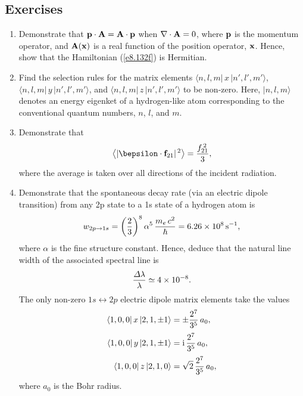 \subsection*{Exercises}
\begin{enumerate}[label=\thechapter.\arabic*,leftmargin=*,widest=9.20]
\item Demonstrate that ${\bf p}\cdot{\bf A}={\bf A}\cdot{\bf p}$ when $\nabla\cdot{\bf A} = 0$, where
${\bf p}$ is the momentum operator, and ${\bf A}({\bf x})$  is a real function of the position operator, ${\bf x}$. 
Hence, show that the Hamiltonian (\ref{e8.132f}) is Hermitian.

\item Find the selection rules for the matrix elements $\langle n,l,m|\,x\,|n',l',m'\rangle$, $\langle n,l,m|\,y\,|n',l',m'\rangle$,
and $\langle n,l,m|\,z\,|n',l',m'\rangle$ to be non-zero. Here, $|n,l,m\rangle$ denotes an energy eigenket of a hydrogen-like
atom corresponding to the conventional quantum numbers, $n$, $l$, and $m$. 

\item Demonstrate that 
$$
\left\langle |\bepsilon\cdot{\bf f}_{21}|^{\,2}\right\rangle = \frac{f_{21}^{\,2}}{3},
$$
where the average is taken over all directions of the incident radiation.

\item Demonstrate that the spontaneous decay rate (via an electric dipole transition) from any 2p state to a 1s state
of a hydrogen atom is
$$
w_{2p\rightarrow 1s} = \left(\frac{2}{3}\right)^8\alpha^5\,\frac{m_e\,c^2}{\hbar}=6.26\times 10^8\,{\rm s}^{-1},
$$
where $\alpha$ is the fine structure constant. 
Hence, deduce that the natural line width of the associated spectral line is
$$
\frac{{\mit\Delta}\lambda}{\lambda} \simeq 4\times 10^{-8}.
$$
The only non-zero $1s\leftrightarrow 2p$ electric dipole matrix elements take the values
\begin{align}
\langle 1,0,0|\,x\,|2,1,\pm 1\rangle &= \pm\frac{2^7}{3^5}\,a_0,\nonumber\\[0.5ex]
\langle 1,0,0|\,y\,|2,1,\pm 1\rangle &= {\rm i}\,\frac{2^7}{3^5}\,a_0,\nonumber\\[0.5ex]
\langle 1,0,0|\,z\,|2,1,0\rangle &= \sqrt{2}\,\frac{2^7}{3^5}\,a_0,\nonumber
\end{align}
where $a_0$ is the Bohr radius.
\end{enumerate}




